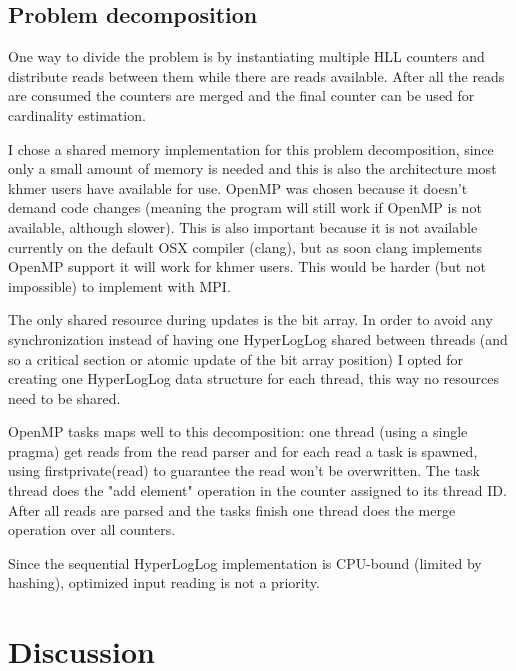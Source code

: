 \documentclass{bioinfo}
\begin{document}
\subsection{Problem decomposition}

One way to divide the problem is by instantiating multiple HLL counters
and distribute reads between them while there are reads available.
After all the reads are consumed the counters are merged and the final
counter can be used for cardinality estimation.

I chose a shared memory implementation for this problem decomposition,
since only a small amount of memory is needed and this is also the architecture
most khmer users have available for use.
OpenMP was chosen because it doesn't demand code changes
(meaning the program will still work if OpenMP is not available,
although slower).
This is also important because it is not available currently on the default OSX compiler (clang),
but as soon clang implements OpenMP support it will work for khmer users.
This would be harder (but not impossible) to implement with MPI.

The only shared resource during updates is the bit array.
In order to avoid any synchronization instead of having one HyperLogLog shared between threads
(and so a critical section or atomic update of the bit array position)
I opted for creating one HyperLogLog data structure for each thread,
this way no resources need to be shared.

OpenMP tasks maps well to this decomposition:
one thread (using a single pragma) get reads from the read parser
and for each read a task is spawned,
using firstprivate(read) to guarantee the read won't be overwritten.
The task thread does the "add element" operation in the counter assigned to its thread ID.
After all reads are parsed and the tasks finish one thread does the merge operation
over all counters.

Since the sequential HyperLogLog implementation is CPU-bound (limited by hashing),
optimized input reading is not a priority.

\section{Discussion}

%
\end{document}
